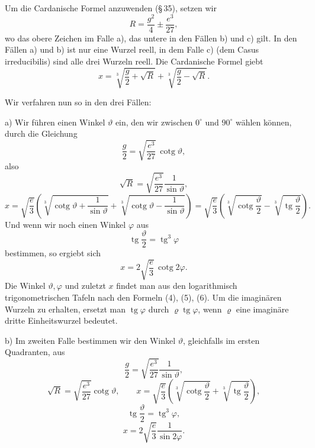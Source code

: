 \documentclass[11pt]{article}
\providecommand{\cotg}{\operatorname{cotg}}
\providecommand{\tg}{\operatorname{tg}}
\begin{document}
Um die Cardanische Formel anzuwenden (\S\,35), setzen wir
\begin{equation}
        R=\frac{g^2}{4}\pm\frac{e^3}{27},
\tag{2}
\end{equation}
wo das obere Zeichen im Falle a), das untere in den Fällen b) und c) gilt. In den Fällen a) und b) ist nur eine Wurzel reell, in dem Falle c) (dem Casus irreducibilis) sind alle drei Wurzeln reell. Die Cardanische Formel giebt
\begin{equation}
        x=\sqrt[3]{\frac g2+\sqrt R}
          +\sqrt[3]{\frac g2-\sqrt R}.
\tag{3}
\end{equation}

Wir verfahren nun so in den drei Fällen:

a) Wir führen einen Winkel $\vartheta$ ein, den wir zwischen $0^\circ$ und $90^\circ$ wählen können, durch die Gleichung
\begin{equation}
        \frac g2=\sqrt{\frac{e^3}{27}}\,\cotg\vartheta,
\tag{4}
\end{equation}
also
\[
        \sqrt R=\sqrt{\frac{e^3}{27}}\frac1{\sin\vartheta},
\]
\[
x=\sqrt{\frac e3}\left(\sqrt[3]{\cotg\vartheta+\frac1{\sin\vartheta}}
+\sqrt[3]{\cotg\vartheta-\frac1{\sin\vartheta}}\right)
=\sqrt{\frac e3}\left(\sqrt[3]{\cotg\frac\vartheta2}
-\sqrt[3]{\tg\frac\vartheta2}\right).
\]
Und wenn wir noch einen Winkel $\varphi$ aus
\begin{equation}
        \tg\frac{\vartheta}{2}=\tg^3\varphi
\tag{5}
\end{equation}
bestimmen, so ergiebt sich
\begin{equation}
        x=2\sqrt{\frac e3}\,\cotg 2\varphi.
\tag{6}
\end{equation}
Die Winkel $\vartheta,\varphi$ und zuletzt $x$ findet man aus den logarithmisch trigonometrischen Tafeln nach den Formeln (4), (5), (6). Um die imaginären Wurzeln zu erhalten, ersetzt man $\tg\varphi$ durch $\varrho\tg\varphi$, wenn $\varrho$ eine imaginäre dritte Einheitswurzel bedeutet.

b) Im zweiten Falle bestimmen wir den Winkel $\vartheta$, gleichfalls im ersten Quadranten, aus
\begin{equation}
        \frac g2=\sqrt{\frac{e^3}{27}}\frac1{\sin\vartheta},
\tag{7}
\end{equation}
\[
        \sqrt R=\sqrt{\frac{e^3}{27}}\cotg\vartheta,\qquad
        x=\sqrt{\frac e3}\left(
        \sqrt[3]{\cotg\frac{\vartheta}{2}}
        +\sqrt[3]{\tg\frac{\vartheta}{2}}\right),
\]
\begin{equation}
        \tg\frac{\vartheta}{2}=\tg^3\varphi,
\tag{8}
\end{equation}
\begin{equation}
        x=2\sqrt{\frac e3}\frac1{\sin 2\varphi}.
\tag{9}
\end{equation}
\end{document}
